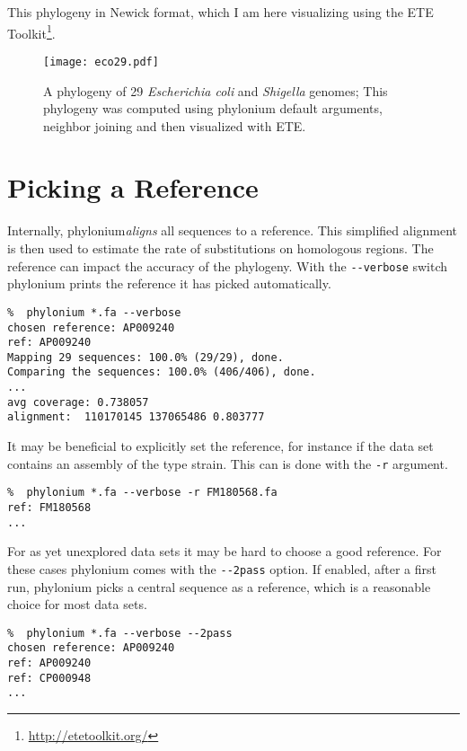 \documentclass[a4paper,10pt,english]{scrartcl}
\newcommand{\tool}[1]{\textsf{#1}}
\newcommand{\phylonium}{\textsf{phylonium}\xspace}
\begin{document}
This phylogeny in Newick format, which I am here visualizing using the ETE Toolkit\footnote{\url{http://etetoolkit.org/}}.

\begin{figure}
  \begin{center}
    \texttt{[image: eco29.pdf]}
  \end{center}
  \caption{A phylogeny of 29 \textit{Escherichia coli} and \textit{Shigella} genomes; This phylogeny was computed using \tool{phylonium} default arguments, neighbor joining and then visualized with ETE.}
\end{figure}


\section{Picking a Reference}

Internally, \phylonium \emph{aligns} all sequences to a reference. This simplified alignment is then used to estimate the rate of substitutions on homologous regions. The reference can  impact the accuracy of the phylogeny. With the \lstinline!--verbose! switch \phylonium prints the reference it has picked automatically.

\begin{lstlisting}
%  phylonium *.fa --verbose
chosen reference: AP009240
ref: AP009240
Mapping 29 sequences: 100.0% (29/29), done.
Comparing the sequences: 100.0% (406/406), done.
...
avg coverage: 0.738057
alignment:  110170145 137065486 0.803777
\end{lstlisting}

It may be beneficial to explicitly set the reference, for instance if the data set contains an assembly of the type strain. This can is done with the \lstinline!-r! argument.

\begin{lstlisting}
%  phylonium *.fa --verbose -r FM180568.fa
ref: FM180568
...
\end{lstlisting}

For as yet unexplored data sets it may be hard to choose a good reference. For these cases \phylonium comes with the \lstinline!--2pass! option. If enabled, after a first run, \phylonium picks a central sequence as a reference, which is a reasonable choice for most data sets.

\begin{lstlisting}
%  phylonium *.fa --verbose --2pass
chosen reference: AP009240
ref: AP009240
ref: CP000948
...
\end{lstlisting}
\end{document}
